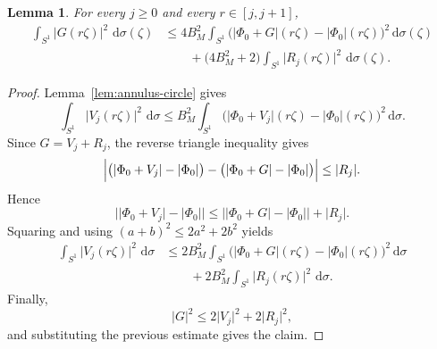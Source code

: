 \documentclass[11pt]{amsart}
\newtheorem{lemma}[theorem]{Lemma}
\theoremstyle{remark}
\newcommand{\abs}[1]{\lvert #1 \rvert}
\newcommand{\dd}{\,\mathrm{d}}
\begin{document}
\begin{lemma}\label{lem:assembly-circle}
For every $j \ge 0$ and every $r \in [j,j+1]$,
\begin{align*}
\int_{S^1} \abs{G(r\zeta)}^2\,\dd \sigma(\zeta)
&\le
4B_M^2 \int_{S^1}
\bigl(\abs{\Phi_0 + G}(r\zeta) - \abs{\Phi_0}(r\zeta)\bigr)^2
\dd \sigma(\zeta) \\
&\qquad +
\bigl(4B_M^2 + 2\bigr)\int_{S^1} \abs{R_j(r\zeta)}^2\,\dd \sigma(\zeta).
\end{align*}
\end{lemma}

\begin{proof}
Lemma~\ref{lem:annulus-circle} gives
\[
\int_{S^1} \abs{V_j(r\zeta)}^2\,\dd \sigma
\le
B_M^2 \int_{S^1}
\bigl(\abs{\Phi_0 + V_j}(r\zeta) - \abs{\Phi_0}(r\zeta)\bigr)^2
\dd \sigma.
\]
Since $G = V_j + R_j$, the reverse triangle inequality gives
\[
\Bigl\lvert
\bigl(\abs{\Phi_0 + V_j} - \abs{\Phi_0}\bigr)
-
\bigl(\abs{\Phi_0 + G} - \abs{\Phi_0}\bigr)
\Bigr\rvert
\le
\abs{R_j}.
\]
Hence
\[
\abs{\abs{\Phi_0 + V_j} - \abs{\Phi_0}}
\le
\abs{\abs{\Phi_0 + G} - \abs{\Phi_0}} + \abs{R_j}.
\]
Squaring and using $(a+b)^2 \le 2a^2 + 2b^2$ yields
\begin{align*}
\int_{S^1} \abs{V_j(r\zeta)}^2\,\dd \sigma
&\le
2B_M^2 \int_{S^1}
\bigl(\abs{\Phi_0 + G}(r\zeta) - \abs{\Phi_0}(r\zeta)\bigr)^2
\dd \sigma \\
&\qquad +
2B_M^2 \int_{S^1} \abs{R_j(r\zeta)}^2\,\dd \sigma.
\end{align*}
Finally,
\[
\abs{G}^2 \le 2\abs{V_j}^2 + 2\abs{R_j}^2,
\]
and substituting the previous estimate gives the claim.
\end{proof}
\end{document}
